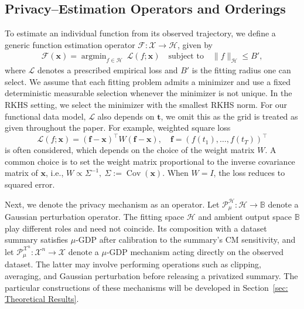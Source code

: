 \documentclass[twoside,11pt]{article}
\DeclareMathOperator*{\argmin}{argmin}
\DeclareMathOperator*{\Cov}{\text{Cov}}
\newcommand{\T}[1]{\text{#1}}   %
\begin{document}
\subsection{Privacy–Estimation Operators and Orderings}
\label{subsec: Privacy–Estimation Operators and Orderings}
To estimate an individual function from its observed trajectory, we define a generic function estimation operator $\mathcal F:\mathcal X\rightarrow \mathcal H$, given by
\begin{equation}
\begin{aligned}
    \mathcal{F}(\mathbf{x})
    =
    \argmin_{f\in\mathcal H}
    \ 
    \mathcal{L}(f;\mathbf{x})
    \quad
    \T{subject to}
    \quad
    \|f\|_{\mathcal H}\le B',
\end{aligned}
\label{eq: F_operator}
\end{equation}
where $\mathcal L$ denotes a prescribed empirical loss and $B'$ is the fitting radius one can select. We assume that each fitting problem admits a minimizer and use a fixed deterministic measurable selection whenever the minimizer is not unique. In the RKHS setting, we select the minimizer with the smallest RKHS norm. For our functional data model, $\mathcal{L}$ also depends on $\mathbf{t}$, we omit this as the grid is treated as given throughout the paper. For example, weighted square loss
\begin{equation}
    \mathcal{L}(f;\mathbf{x})
    =
    (\mathbf{f}-\mathbf{x})^\top W (\mathbf{f}-\mathbf{x}),
    \quad
    \mathbf{f} = (f(t_1),\ldots,f(t_T))^\top
    \label{eq: weight least square}
\end{equation}
is often considered, which depends on the choice of the weight matrix $W$. A common choice is to set the weight matrix proportional to the inverse covariance matrix of $\mathbf{x}$, i.e., $W \propto \Sigma^{-1},\ \Sigma := \Cov(\mathbf{x})$. When $W = I$, the loss reduces to squared error.

Next, we denote the privacy mechanism as an operator. Let $\mathcal{P}_\mu^{\mathcal H}:\mathcal H\rightarrow \mathbb{B}$ denote a Gaussian perturbation operator. The fitting space \(\mathcal H\) and ambient output space \(\mathbb B\) play different roles and need not coincide. Its composition with a dataset summary satisfies $\mu$-GDP after calibration to the summary's CM sensitivity, and let $\mathcal{P}_\mu^{\mathcal{X}^n}:\mathcal{X}^n\rightarrow\mathcal{X}$ denote a $\mu$-GDP mechanism acting directly on the observed dataset. The latter may involve performing operations such as clipping, averaging, and Gaussian perturbation before releasing a privatized summary. The particular constructions of these mechanisms will be developed in Section~\ref{sec: Theoretical Results}.
\end{document}

